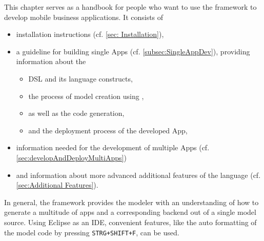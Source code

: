
This chapter serves as a handbook for people who want to use the \MD framework to develop mobile business applications. It consists of

\begin{itemize}
	\item installation instructions (cf. \ref{sec: Installation}),
	\item a guideline for building single Apps (cf. \ref{subsec:SingleAppDev}), providing information about the
	\begin{itemize}
		\item DSL and its language constructs,
		\item the process of model creation using \MD,
		\item as well as the code generation,
		\item and the deployment process of the developed App,
	\end{itemize}
	\item information needed for the development of multiple Apps (cf. \ref{sec:developAndDeployMultiApps})
	\item and information about more advanced additional features of the language (cf. \ref{sec:Additional Features}).
\end{itemize}

In general, the \MD framework provides the modeler with an understanding of how to generate a multitude of apps and a corresponding backend out of a single model source. Using Eclipse as an IDE, convenient features, like the auto formatting of the model code by pressing \lstinline|STRG+SHIFT+F|, can be used.